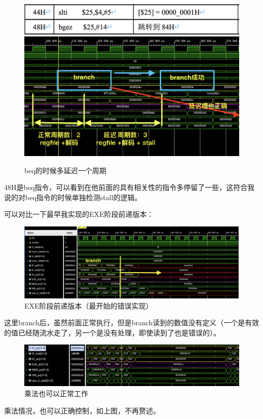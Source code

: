 \documentclass[a4paper]{article}
\begin{document}
\begin{figure}[H]
    \centering
    \includegraphics[width=\linewidth]{img/旁路修改图片/beq指令.png}
    \includegraphics[width=\linewidth]{img/旁路修改图片/beq的时候多延迟一个周期.png}
    \caption{beq的时候多延迟一个周期}
\end{figure}

48H是beq指令，可以看到在他前面的具有相关性的指令多停留了一些，这符合我说的对beq指令的时候单独检测stall的逻辑。

可以对比一下最早我实现的EXE阶段前递版本：

\begin{figure}[H]
    \centering
    \includegraphics[width=\linewidth]{img/先前错误/增加完EXE阶段旁路2.png}
    \caption{EXE阶段前递版本（最开始的错误实现）}
\end{figure}

这里branch后，虽然前面正常执行，但是branch读到的数值没有定义（一个是有效的值已经随流水走了，另一个是没有处理，即使读到了也是错误的）。



\begin{figure}[H]
    \centering
    \includegraphics[width=\linewidth]{img/旁路修改图片/乘法情况ech也正常工作.png}
    \caption{乘法也可以正常工作}
\end{figure}
乘法情况，也可以正确控制，如上图，不再赘述。
\end{document}
